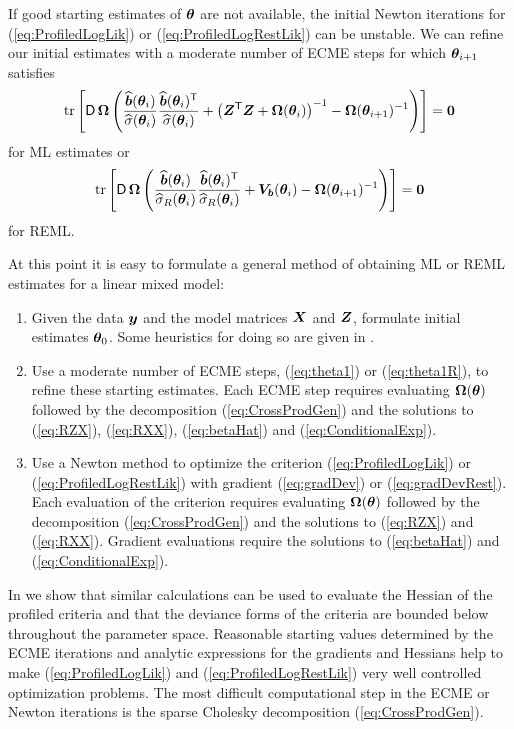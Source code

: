 \documentclass[12pt]{article}
\begin{document}
If good starting estimates of $\bm{\theta}$ are not available, the initial
Newton iterations for (\ref{eq:ProfiledLogLik}) or
(\ref{eq:ProfiledLogRestLik}) can be unstable.  We can refine our
initial estimates with a moderate number of ECME steps
for which $\bm{\theta}_{i+1}$ satisfies
\begin{equation}
  \label{eq:theta1}
  \operatorname{tr}\left[\operatorname{\mathsf{D}}\bm{\Omega}\left(
      \frac{\widehat{\bm{b}}(\bm{\theta}_i)}{\widehat{\sigma}(\bm{\theta}_{i})}
      \frac{\widehat{\bm{b}}(\bm{\theta}_i)^\mathsf{T}}{\widehat{\sigma}(\bm{\theta}_{i})}+
      \left(\bm{Z}^\mathsf{T}\bm{Z}+\bm{\Omega}(\bm{\theta}_{i})\right)^{-1}
      -\bm{\Omega}(\bm{\theta}_{i+1})^{-1}\right)\right]=\bm{0}
\end{equation}
for ML estimates or
\begin{equation}
  \label{eq:theta1R}
  \operatorname{tr}\left[\operatorname{\mathsf{D}}\bm{\Omega}\left(
      \frac{\widehat{\bm{b}}(\bm{\theta}_{i})}{\widehat{\sigma}_R(\bm{\theta}_i)}
      \frac{\widehat{\bm{b}}(\bm{\theta}_{i})^\mathsf{T}}{\widehat{\sigma}_R(\bm{\theta}_i)}+
      \bm{V}_{\bm{b}}(\bm{\theta}_{i})
      -\bm{\Omega}(\bm{\theta}_{i+1})^{-1}\right)\right]=\bm{0}
\end{equation}
for REML.

At this point it is easy to formulate a general method of obtaining ML
or REML estimates for a linear mixed model:
\begin{enumerate}
\item Given the data $\bm{y}$ and the model matrices $\bm{X}$ and $\bm{Z}$,
  formulate initial estimates $\bm{\theta}_0$.  Some heuristics for doing
  so are given in \citet[ch.~3]{pinh:bate:2000}.
\item Use a moderate number of ECME steps, (\ref{eq:theta1}) or
  (\ref{eq:theta1R}), to refine these starting estimates.  Each ECME
  step requires evaluating $\bm{\Omega}(\bm{\theta})$ followed by the
  decomposition (\ref{eq:CrossProdGen}) and the solutions to (\ref{eq:RZX}),
  (\ref{eq:RXX}), (\ref{eq:betaHat}) and (\ref{eq:ConditionalExp}).
\item Use a Newton method to optimize the criterion
  (\ref{eq:ProfiledLogLik}) or (\ref{eq:ProfiledLogRestLik}) with
  gradient (\ref{eq:gradDev}) or (\ref{eq:gradDevRest}).  Each
  evaluation of the criterion requires evaluating $\bm{\Omega}(\bm{\theta})$
  followed by the decomposition (\ref{eq:CrossProdGen}) and the
  solutions to (\ref{eq:RZX}) and (\ref{eq:RXX}).  Gradient
  evaluations require the solutions to (\ref{eq:betaHat}) and
  (\ref{eq:ConditionalExp}).
\end{enumerate}
In \citet{bate:debr:2004} we show that similar calculations can be
used to evaluate the Hessian of the profiled criteria and that the
deviance forms of the criteria are bounded below throughout the
parameter space.  Reasonable starting values determined by
the ECME iterations and analytic expressions for the gradients and
Hessians help to make (\ref{eq:ProfiledLogLik}) and
(\ref{eq:ProfiledLogRestLik}) very well controlled optimization
problems.  The most difficult computational step in the ECME or Newton
iterations is the sparse Cholesky decomposition (\ref{eq:CrossProdGen}).
\end{document}
